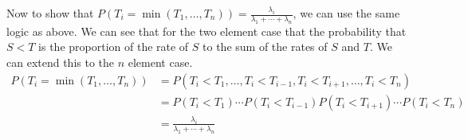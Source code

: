 \documentclass[answers,12pt,addpoints]{exam}
\begin{document}
\begin{questions}
\begin{solution}
        Now to show that \( P(T_i = \min (T_1, \ldots, T_n)) = \frac{\lambda_i}{\lambda_1 + \cdots + \lambda_n} \), we can use the same logic as above. We can see that for the two element case that the probability that \(S < T\) is the proportion of the rate of \(S\) to the sum of the rates of \(S\) and \(T\). We can extend this to the \(n\) element case.\\
        \begin{align*}
            P(T_i = \min (T_1, \ldots, T_n)) &= P(T_i < T_1, \ldots, T_i < T_{i-1}, T_i < T_{i+1}, \ldots, T_i < T_n)\\
            &= P(T_i < T_1) \cdots P(T_i < T_{i-1})P(T_i < T_{i+1}) \cdots P(T_i < T_n)\\
            &= \frac{\lambda_i}{\lambda_1 + \cdots + \lambda_n}
        \end{align*}
    \end{solution}
    \newpage


\end{questions}
\end{document}
